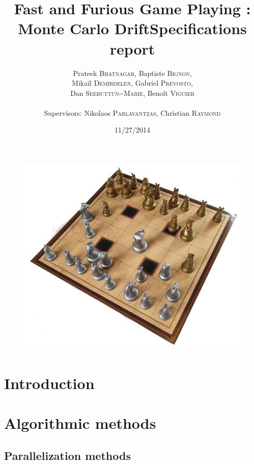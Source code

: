 \documentclass[12pt]{article}
\title{Fast and Furious Game Playing : Monte Carlo Drift\smallbreak Specifications report} %
\author{Prateek \textsc{Bhatnagar}, Baptiste \textsc{Bignon}, \\
        Mikaïl \textsc{Demirdelen}, Gabriel \textsc{Prevosto}, \\
        Dan \textsc{Seeruttun-{}-Marie}, Benoît \textsc{Viguier} \\
        \\
        Supervisors: Nikolaos \textsc{Parlavantzas}, Christian \textsc{Raymond}}
\date{11/27/2014}
\begin{document}
\maketitle

\begin{figure}[!h] 
\centerline{\includegraphics[scale=0.50]{Pictures/arimaa}}
\end{figure}
\newpage


\begin{abstract}
	
\end{abstract}
\newpage

\tableofcontents
\newpage


\section{Introduction}						\label{sec:introduction} 			
\newpage

\section{Algorithmic methods}
					\label{sec:algorithmicMethods}
	\subsection{Parallelization methods}			\label{sec:parallelization}		
\end{document}
